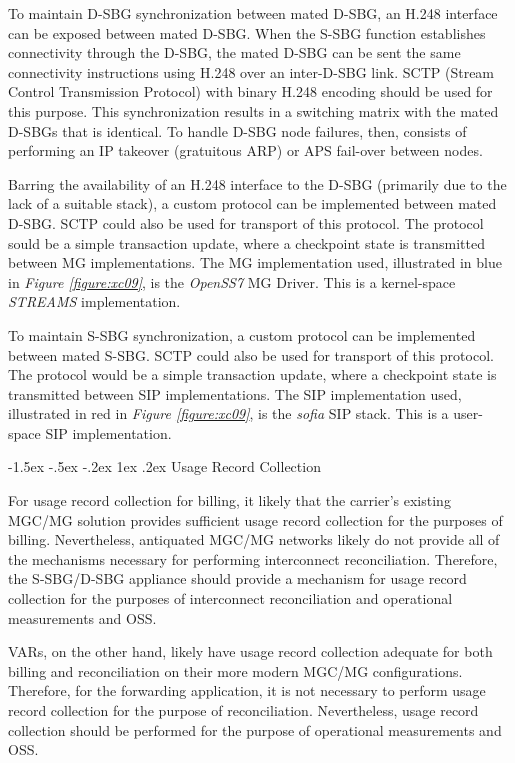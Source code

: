 \documentclass[letterpaper,final,notitlepage,twocolumn,10pt,twoside]{article}
\makeatletter
\let\normalsize = \small
\let\small = \footnotesize
\let\footnotesize = \scriptsize
\let\scriptsize = \tiny
\renewcommand\subsection{\@startsection{subsection}{2}{\z@}%
                                     {-1.5ex \@plus -.5ex \@minus -.2ex}%
                                     {1ex \@plus .2ex}%
                                     {\normalfont\normalsize\bfseries}}
\makeatother
\begin{document}
To maintain D-SBG synchronization between mated D-SBG, an H.248 interface can be
exposed between mated D-SBG.  When the S-SBG function establishes connectivity
through the D-SBG, the mated D-SBG can be sent the same connectivity
instructions using H.248 over an inter-D-SBG link.  SCTP (Stream Control
Transmission Protocol) with binary H.248 encoding should be used for this
purpose.  This synchronization results in a switching matrix with the mated
D-SBGs that is identical.  To handle D-SBG node failures, then, consists of
performing an IP takeover (gratuitous ARP) or APS fail-over between nodes.

Barring the availability of an H.248 interface to the D-SBG (primarily due to
the lack of a suitable stack), a custom protocol can be implemented between
mated D-SBG.  SCTP could also be used for transport of this protocol.  The
protocol sould be a simple transaction update, where a checkpoint state is
transmitted between MG implementations.  The MG implementation used,
illustrated in blue in {\sl Figure \ref{figure:xc09}}, is the {\sl OpenSS7} MG
Driver.  This is a kernel-space {\sl STREAMS} implementation.

To maintain S-SBG synchronization, a custom protocol can be implemented between
mated S-SBG.  SCTP could also be used for transport of this protocol.  The
protocol would be a simple transaction update, where a checkpoint state is
transmitted between SIP implementations.  The SIP implementation used,
illustrated in red in {\sl Figure \ref{figure:xc09}}, is the {\sl sofia} SIP
stack.  This is a user-space SIP implementation.

\subsection{Usage Record Collection}

For usage record collection for billing, it likely that the carrier's existing
MGC/MG solution provides sufficient usage record collection for the purposes of
billing.  Nevertheless, antiquated MGC/MG networks likely do not provide all of
the mechanisms necessary for performing interconnect reconciliation.  Therefore,
the S-SBG/D-SBG appliance should provide a mechanism for usage record collection
for the purposes of interconnect reconciliation and operational measurements and
OSS.

VARs, on the other hand, likely have usage record collection adequate for both
billing and reconciliation on their more modern MGC/MG configurations.
Therefore, for the forwarding application, it is not necessary to perform usage
record collection for the purpose of reconciliation.  Nevertheless, usage record
collection should be performed for the purpose of operational measurements and
OSS.
\end{document}
